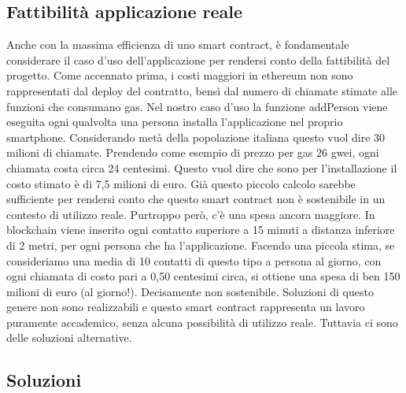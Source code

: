 \subsection{Fattibilità applicazione reale}
Anche con la massima efficienza di uno smart contract, è fondamentale considerare il caso d’uso dell’applicazione per rendersi conto della fattibilità del progetto.
Come accennato prima, i costi maggiori in ethereum non sono rappresentati dal deploy del contratto, bensì dal numero di chiamate stimate alle funzioni che consumano gas.
Nel nostro caso d’uso la funzione addPerson viene eseguita ogni qualvolta una persona installa l’applicazione nel proprio smartphone. Considerando metà della popolazione italiana questo vuol dire 30 milioni di chiamate. Prendendo come esempio di prezzo per gas 26 gwei, ogni chiamata costa circa 24 centesimi. Questo vuol dire che sono per l’installazione il costo stimato è di 7,5 milioni di euro.
Già questo piccolo calcolo sarebbe sufficiente per rendersi conto che questo smart contract non è sostenibile in un contesto di utilizzo reale. Purtroppo però, c’è una spesa ancora maggiore. In blockchain viene inserito ogni contatto superiore a 15 minuti a distanza inferiore di 2 metri, per ogni persona che ha l’applicazione. Facendo una piccola stima, se consideriamo una media di 10 contatti di questo tipo a persona al giorno, con ogni chiamata di costo pari a 0,50 centesimi circa, si ottiene una spesa di ben 150 milioni di euro (al giorno!).
Decisamente non sostenibile. Soluzioni di questo genere non sono realizzabili e questo smart contract rappresenta un lavoro puramente accademico, senza alcuna possibilità di utilizzo reale. 
Tuttavia ci sono delle soluzioni alternative.
\\
\subsection{Soluzioni}
